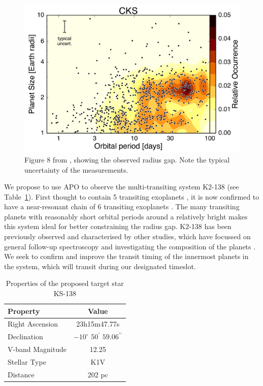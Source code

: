 \documentclass[twocolumn]{aastex631}
\begin{document}
\begin{figure}
    \centering
    \includegraphics[width=\columnwidth]{fulton_2017_fig8.png}
    \caption{Figure 8 from \citep{Fulton+2017}, showing the observed radius gap. Note the typical uncertainty of the measurements.}
    \label{fig:fulton_radius_gap}
\end{figure}

We propose to use APO to observe the multi-transiting system K2-138 (see Table~\ref{tab:star}). First thought to contain 5 transiting exoplanets \cite{Christiansen+2018}, it is now confirmed to have a near-resonant chain of 6 transiting exoplanets \citep{Hardegree-Ullman+2021}. The many transiting planets with reasonably short orbital periods around a relatively bright makes this system ideal for better constraining the radius gap. K2-138 has been previously observed and characterised by other studies, which have focussed on general follow-up spectroscopy \citep{Lopez+2019} and investigating the composition of the planets \cite{Acuna+2022}. We seek to confirm and improve the transit timing of the innermost planets in the system, which will transit during our designated timeslot.

\begin{table}[htb]
    \centering
    \begin{tabular}{l|c} 
        \hline
        Property & Value \\
        \hline\hline
        Right Ascension & 23h15m47.77s \\
        Declination & $-10^\circ$ $50^\prime$ $59.06^{\prime\prime}$ \\
        V-band Magnitude & 12.25 \\
        Stellar Type & K1V \\
        Distance & 202 pc \\
        \hline
    \end{tabular}
    \caption{Properties of the proposed target star KS-138}
    \label{tab:star}
\end{table}
\end{document}

